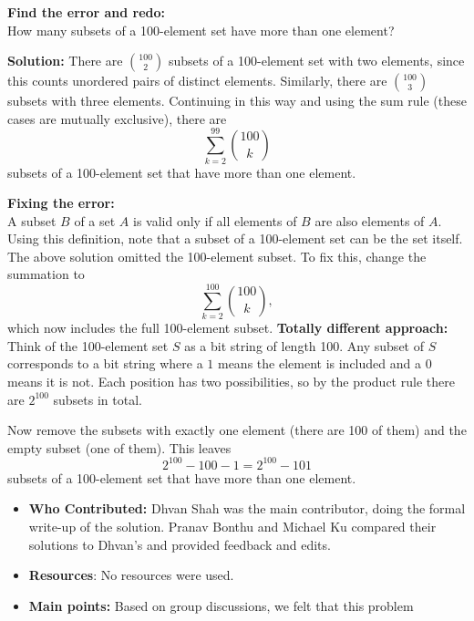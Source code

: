 \documentclass[11pt]{article}
\begin{document}
\textbf{Find the error and redo:}\\
How many subsets of a 100-element set have more than one element?

\textbf{Solution:} There are $\binom{100}{2}$ subsets of a 100-element set with two elements, since this counts unordered pairs of distinct elements. Similarly, there are $\binom{100}{3}$ subsets with three elements. Continuing in this way and using the sum rule (these cases are mutually exclusive), there are 
\[
\sum_{k=2}^{99}\binom{100}{k}
\]
subsets of a 100-element set that have more than one element.

\textbf{Fixing the error:}\\
A subset $B$ of a set $A$ is valid only if all elements of $B$ are also elements of $A$. Using this definition, note that a subset of a 100-element set can be the set itself. The above solution omitted the 100-element subset. To fix this, change the summation to 
\[
\sum_{k=2}^{100}\binom{100}{k},
\]
which now includes the full 100-element subset.
\textbf{Totally different approach:}\\
Think of the 100-element set $S$ as a bit string of length 100. Any subset of $S$ corresponds to a bit string where a $1$ means the element is included and a $0$ means it is not. Each position has two possibilities, so by the product rule there are $2^{100}$ subsets in total.

Now remove the subsets with exactly one element (there are 100 of them) and the empty subset (one of them). This leaves
\[
2^{100}-100-1=2^{100}-101
\]
subsets of a 100-element set that have more than one element.

\begin{itemize}
\item \textbf{Who Contributed:} Dhvan Shah was the main contributor, doing the formal write-up of the solution. Pranav Bonthu and Michael Ku compared their solutions to Dhvan’s and provided feedback and edits.
\item \textbf{Resources}: No resources were used.
\item \textbf{Main points:} Based on group discussions, we felt that this problem
\end{itemize}
\end{document}
